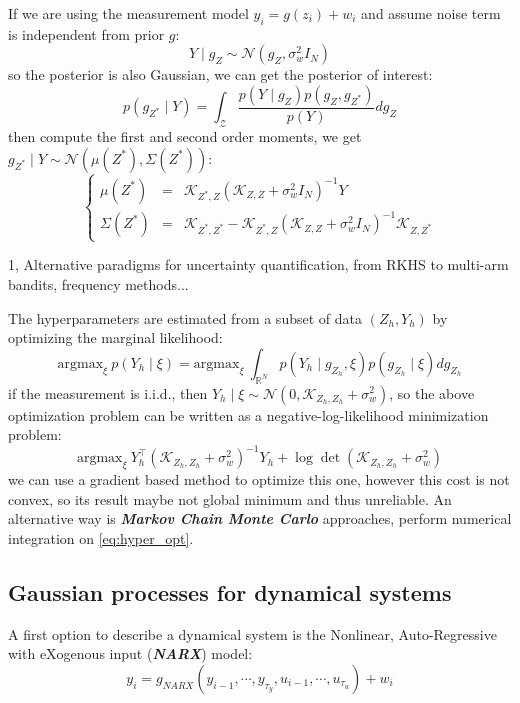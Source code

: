 \documentclass[10pt]{elegantbook}
\newcommand{\mydefination}[1]{\textbf{\textit{\textcolor{structurecolor}{#1}}}}
\begin{document}
If we are using the measurement model $y_i = g(z_i) + w_i$ and assume noise term is independent from prior $g$:
\[
Y \mid g_Z \sim \mathcal N (g_Z, \sigma_w^2 I_N)
\]
so the posterior is also Gaussian, we can get the posterior of interest:
\[
p(g_{Z^*} \mid Y) = \int_{\mathcal Z} \frac{p(Y \mid g_Z)p(g_Z, g_{Z^*})}{p(Y)} dg_Z
\]
then compute the first and second order moments, we get $g_{Z^*} \mid Y \sim \mathcal N (\mu(Z^*), \Sigma(Z^*))$:
\[
\left \{
\begin{array}{lll}
    \mu(Z^*) &=& \mathscr{K}_{Z^*, Z} (\mathscr{K}_{Z, Z} + \sigma_w^2 I_N)^{-1} Y \\
    \Sigma(Z^*) &=& \mathscr{K}_{Z^*, Z^*} - \mathscr{K}_{Z^*, Z} (\mathscr{K}_{Z, Z} + \sigma_w^2 I_N)^{-1} \mathscr{K}_{Z, Z^*}
\end{array}    
\right .
\]

\begin{remark}
    1, Alternative paradigms for uncertainty quantification, from RKHS to multi-arm bandits, frequency methods...
\end{remark}

The hyperparameters are estimated from a subset of data $(Z_h, Y_h)$ by optimizing the marginal likelihood:
\begin{equation} \label{eq:hyper_opt}
\text{argmax}_{\xi} ~ p(Y_h \mid \xi) = \text{argmax}_{\xi} ~ \int_{\mathbb R^N} p(Y_h \mid g_{Z_h}, \xi)p(g_{Z_h} \mid \xi)dg_{Z_h}
\end{equation}
if the measurement is i.i.d., then $Y_h \mid \xi \sim \mathcal N(0, \mathscr{K}_{Z_h, Z_h} + \sigma_w^2)$, so the above optimization
problem can be written as a negative-log-likelihood minimization problem:
\begin{equation} \label{eq:hyper_nll_opt}
\text{argmax}_{\xi} ~ Y_h^{\top}(\mathscr{K}_{Z_h, Z_h} + \sigma_w^2)^{-1}Y_h + \log \det(\mathscr{K}_{Z_h, Z_h} + \sigma_w^2)
\end{equation}
we can use a gradient based method to optimize this one, however this cost is not convex, so its result maybe not global minimum and 
thus unreliable. An alternative way is \mydefination{Markov Chain Monte Carlo} approaches, perform numerical integration on \ref{eq:hyper_opt}.

\subsection{Gaussian processes for dynamical systems}
A first option to describe a dynamical system is the Nonlinear, Auto-Regressive with eXogenous input (\mydefination{NARX}) model:
\[
y_i = g_{NARX}(y_{i-1}, \cdots, y_{\tau_y}, u_{i-1}, \cdots, u_{\tau_u}) + w_i
\]
\end{document}
